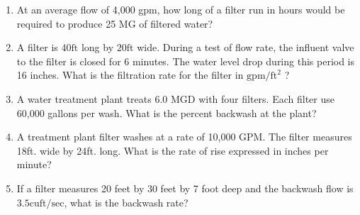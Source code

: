 \begin{enumerate}
	\item At an average flow of 4,000 gpm, how long of a filter run in hours would be required to produce 25 MG of filtered water?
	
	\item A filter is $40 \mathrm{ft}$ long by $20 \mathrm{ft}$ wide. During a test of flow rate, the influent valve to the filter is closed for 6 minutes. The water level drop during this period is 16 inches. What is the filtration rate for the filter in $\mathrm{gpm} / \mathrm{ft}^{2}$ ?\\

\item A water treatment plant treats 6.0 MGD with four filters. Each filter use 60,000 gallons per wash. What is the percent backwash at the plant?\\

\item A treatment plant filter washes at a rate of 10,000 GPM. The filter measures 18ft. wide by 24ft. long. What is the rate of rise expressed in inches per minute?\\


\item If a filter measures 20 feet by 30 feet by 7 foot deep and the backwash flow is $3.5 \mathrm{cuft} / \mathrm{sec}$, what is the backwash rate?\\

\end{enumerate}
